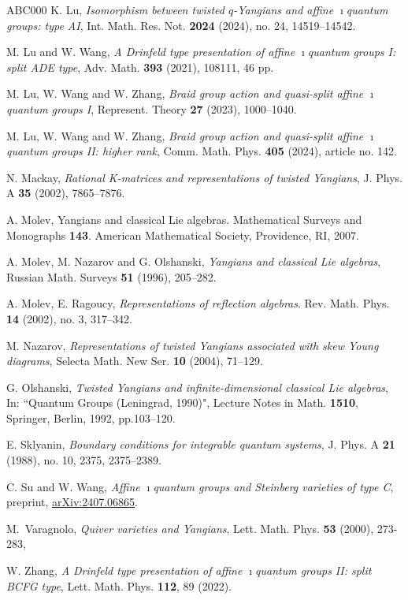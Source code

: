 \documentclass[11pt,reqno]{amsart}
\numberwithin{equation}{section}
\theoremstyle{definition}
\theoremstyle{remark}
\begin{document}
\begin{thebibliography}{ABC000}
K. Lu, \emph{Isomorphism between twisted $q$-Yangians and affine $\imath$quantum groups: type AI}, Int. Math. Res. Not. \textbf{2024} (2024), no. 24, 14519--14542.

 M. Lu and W. Wang,
{\em A Drinfeld type presentation of affine $\imath$quantum groups I: split ADE type}, Adv. Math. {\bf 393} (2021), 108111, 46 pp.

 M. Lu, W. Wang and W. Zhang,
{\em Braid group action and quasi-split affine $\imath$quantum groups I},  Represent. Theory {\bf27} (2023), 1000--1040. 

 M. Lu, W. Wang and W. Zhang,
{\em Braid group action and quasi-split affine $\imath$quantum groups II: higher rank}, Comm. Math. Phys. {\bf405} (2024), article no. 142. %

 N. Mackay, 
{\em Rational K-matrices and representations of twisted Yangians}, J. Phys. A \textbf{35} (2002), 7865--7876.

A. Molev, Yangians and classical Lie algebras. Mathematical Surveys and Monographs \textbf{143}. American Mathematical Society, Providence, RI, 2007.

A. Molev, M. Nazarov and G. Olshanski,
{\em Yangians and classical Lie algebras}, Russian Math. Surveys \textbf{51} (1996), 205--282. 

A. Molev, E. Ragoucy,
\textit{Representations of reflection algebras}. Rev. Math. Phys. \textbf{14} (2002), no. 3, 317–342.

M. Nazarov, {\it Representations of twisted Yangians associated with skew Young diagrams}, Selecta Math. New Ser. \textbf{10} (2004), 71--129.

G. Olshanski, {\it Twisted Yangians and infinite-dimensional classical Lie algebras}, In: ``Quantum Groups (Leningrad, 1990)", Lecture Notes in Math. \textbf{1510}, Springer, Berlin, 1992, pp.103--120.

E. Sklyanin,
{\it Boundary conditions for integrable quantum systems},
J. Phys. A \textbf{21} (1988), no. 10, 2375, 2375--2389.

C. Su and W. Wang, {\it Affine 
$\imath$quantum groups and Steinberg varieties of type C}, preprint, \href{https://arxiv.org/abs/2407.06865}{arXiv:2407.06865}.

M.~Varagnolo, {\em Quiver varieties and Yangians}, 
Lett. Math. Phys. {\bf 53} (2000), 273-283,

 W. Zhang,
{\em A Drinfeld type presentation of affine $\imath$quantum groups II: split BCFG type}, Lett. Math. Phys. {\bf 112}, 89 (2022).

\end{thebibliography}
\end{document}
